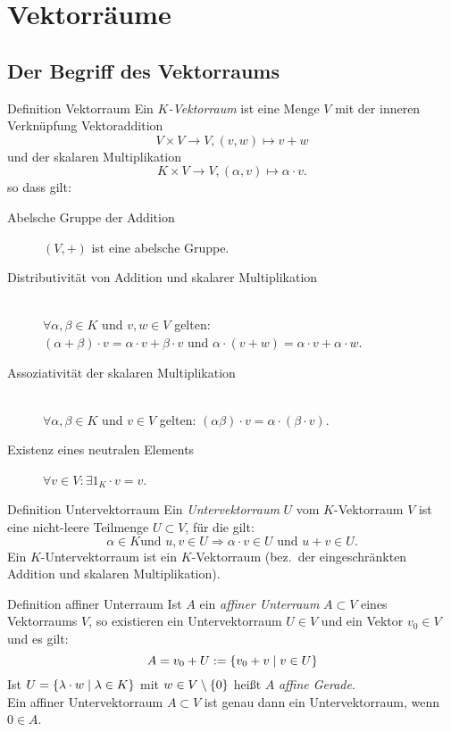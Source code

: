 \documentclass[main.tex]{subfiles}
\begin{document}
\section*{Vektorräume}
\subsection*{Der Begriff des Vektorraums}
\begin{karte}{Definition Vektorraum}
    Ein \( K \)\textit{-Vektorraum} ist eine Menge \(V\) mit der inneren 
    Verknüpfung Vektoraddition 
    \[ V \times V \rightarrow V, (v,w) \mapsto v + w \]
    und der skalaren Multiplikation 
    \[ K \times V \rightarrow V, (\alpha, v) \mapsto 
    \alpha \cdot v. \]
    so dass gilt: 
    \begin{description}
        \item[Abelsche Gruppe der Addition]
        \( (V,+) \) ist eine abelsche Gruppe.  
        \item[Distributivität von Addition und skalarer Multiplikation] \hfill \\ 
        \( \forall \alpha, \beta \in K\) und \( v, w \in V\) gelten: \\
        \( (\alpha + \beta) \cdot v =  \alpha \cdot v + \beta \cdot v\)
        und 
        \( \alpha \cdot ( v + w) = \alpha \cdot v + \alpha \cdot w\).
        \item[Assoziativität der skalaren Multiplikation] \hfill \\
        \( \forall \alpha, \beta \in K\) und \( v \in V\) gelten:
        \((\alpha \beta) \cdot v = \alpha \cdot (\beta \cdot v)\).
        \item[Existenz eines neutralen Elements]
        \( \forall v \in V : \exists 1_K \cdot v = v\).
    \end{description}
\end{karte}
\begin{karte}{Definition Untervektorraum}
    Ein \textit{Untervektorraum} \(U\) vom \(K\)-Vektorraum \(V\) ist eine nicht-leere
    Teilmenge \(U \subset V\), für die gilt: 
    \[\alpha \in K \text {und } u, v \in U \Rightarrow \alpha \cdot v \in U
    \text{ und } u + v \in U.\]
    Ein \(K\)-Untervektorraum ist ein \(K\)-Vektorraum 
    (bez.\ der eingeschränkten Addition und skalaren Multiplikation).
\end{karte}
\begin{karte}{Definition affiner Unterraum}
    Ist \(A\) ein \textit{affiner Unterraum} \(A \subset V\) eines Vektorraums \(V\),
    so existieren ein Untervektorraum \(U \in V\) und ein Vektor \(v_0 \in V\) 
    und es gilt: 
    \[A = v_0 + U := \{v_0 + v \;\vert \; v \in U\}\] 
    Ist \(U = \{\lambda \cdot w \;\vert \; \lambda \in K\}\) 
    mit \(w \in V \setminus \{0\}\) heißt \(A\) \textit{affine Gerade}. \\
    Ein affiner Untervektorraum \(A \subset V\) ist genau 
    dann ein Untervektorraum, wenn \(0 \in A\).
\end{karte}
\end{document}
